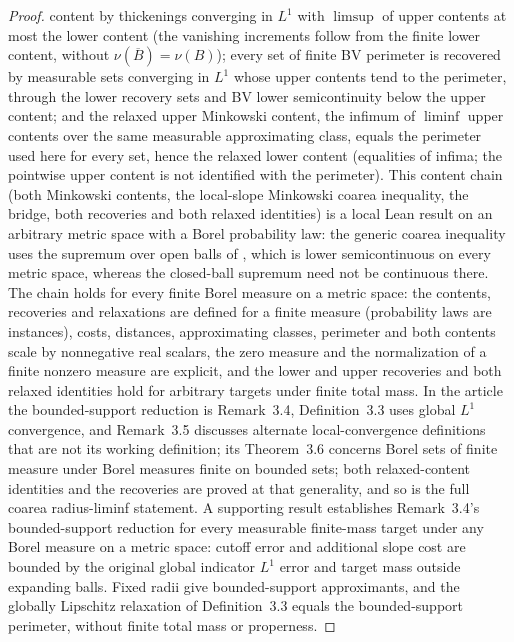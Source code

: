 \begin{proof}
  content by thickenings converging in $L^1$ with $\limsup$ of upper contents at most the lower
  content (the vanishing increments follow from the finite lower content, without
  $\nu(\overline B)=\nu(B)$); every set of finite BV perimeter is recovered by measurable sets
  converging in $L^1$ whose upper contents tend to the perimeter, through the lower recovery sets
  and BV lower semicontinuity below the upper content; and the relaxed upper Minkowski content,
  the infimum of $\liminf$ upper contents over the same measurable approximating class, equals
  the perimeter used here for every set, hence the relaxed lower content (equalities
  of infima; the pointwise upper content is not identified with the perimeter).
  This content chain (both Minkowski contents, the local-slope Minkowski coarea inequality, the
  bridge, both recoveries and both relaxed identities) is a local Lean result on an arbitrary
  metric space with a Borel probability law: the generic coarea inequality uses the supremum over
  open balls of \cite[(3.1)]{AmbrosioDiMarinoGigli2017Minkowski}, which is lower semicontinuous on
  every metric space, whereas the closed-ball supremum need not
  be continuous there. The chain holds for every finite Borel
  measure on a metric space: the contents, recoveries and relaxations are defined for a finite
  measure (probability laws are instances), costs, distances, approximating classes, perimeter and
  both contents scale by nonnegative real scalars, the zero measure and the normalization of a
  finite nonzero measure are explicit, and the lower and upper recoveries and both relaxed
  identities hold for arbitrary targets under finite total mass. In the article the
  bounded-support reduction is Remark~3.4, Definition~3.3 uses global $L^1$ convergence, and
  Remark~3.5 discusses alternate local-convergence definitions that are not its working
  definition; its Theorem~3.6 concerns Borel sets of finite measure under Borel measures finite on
  bounded sets; both relaxed-content identities and the recoveries are proved at
  that generality, and so is the full coarea radius-liminf statement.
  A supporting result establishes Remark~3.4's
  bounded-support reduction for every measurable finite-mass target under any Borel measure on
  a metric space: cutoff error and additional slope cost are bounded by the original global
  indicator $L^1$ error and target mass outside expanding balls. Fixed radii give
  bounded-support approximants, and the globally Lipschitz relaxation of Definition~3.3 equals
  the bounded-support perimeter, without finite total mass or properness.

\end{proof}
